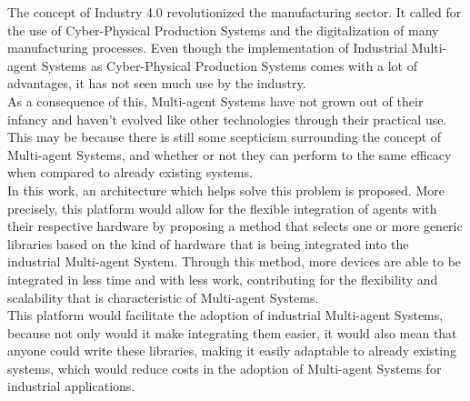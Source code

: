 
%

The concept of Industry 4.0 revolutionized the manufacturing sector. It called for the use of Cyber-Physical Production Systems and the digitalization of many manufacturing processes. Even though the implementation of Industrial Multi-agent Systems as Cyber-Physical Production Systems comes with a lot of advantages, it has not seen much use by the industry.\\

As a consequence of this, Multi-agent Systems have not grown out of their infancy and haven't evolved like other technologies through their practical use. This may be because there is still some scepticism surrounding the concept of Multi-agent Systems, and whether or not they can perform to the same efficacy when compared to already existing systems.\\

In this work, an architecture which helps solve this problem is proposed. More precisely, this platform would allow for the flexible integration of agents with their respective hardware by proposing a method that selects one or more generic libraries based on the kind of hardware that is being integrated into the industrial Multi-agent System. Through this method, more devices are able to be integrated in less time and with less work, contributing for the flexibility and scalability that is characteristic of Multi-agent Systems.\\

This platform would facilitate the adoption of industrial Multi-agent Systems, because not only would it make integrating them easier, it would also mean that anyone could write these libraries, making it easily adaptable to already existing systems, which would reduce costs in the adoption of Multi-agent Systems for industrial applications.\\

%
%

